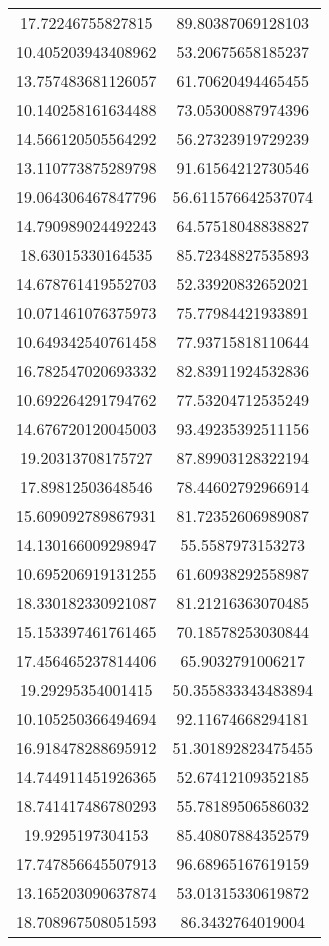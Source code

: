 \begin{table}
\begin{tabular}{cc}
17.72246755827815 & 89.80387069128103 \\
10.405203943408962 & 53.20675658185237 \\
13.757483681126057 & 61.70620494465455 \\
10.140258161634488 & 73.05300887974396 \\
14.566120505564292 & 56.27323919729239 \\
13.110773875289798 & 91.61564212730546 \\
19.064306467847796 & 56.611576642537074 \\
14.790989024492243 & 64.57518048838827 \\
18.63015330164535 & 85.72348827535893 \\
14.678761419552703 & 52.33920832652021 \\
10.071461076375973 & 75.77984421933891 \\
10.649342540761458 & 77.93715818110644 \\
16.782547020693332 & 82.83911924532836 \\
10.692264291794762 & 77.53204712535249 \\
14.676720120045003 & 93.49235392511156 \\
19.20313708175727 & 87.89903128322194 \\
17.89812503648546 & 78.44602792966914 \\
15.609092789867931 & 81.72352606989087 \\
14.130166009298947 & 55.5587973153273 \\
10.695206919131255 & 61.60938292558987 \\
18.330182330921087 & 81.21216363070485 \\
15.153397461761465 & 70.18578253030844 \\
17.456465237814406 & 65.9032791006217 \\
19.29295354001415 & 50.355833343483894 \\
10.105250366494694 & 92.11674668294181 \\
16.918478288695912 & 51.301892823475455 \\
14.744911451926365 & 52.67412109352185 \\
18.741417486780293 & 55.78189506586032 \\
19.9295197304153 & 85.40807884352579 \\
17.747856645507913 & 96.68965167619159 \\
13.165203090637874 & 53.01315330619872 \\
18.708967508051593 & 86.3432764019004 \\

\end{tabular}
\end{table}
